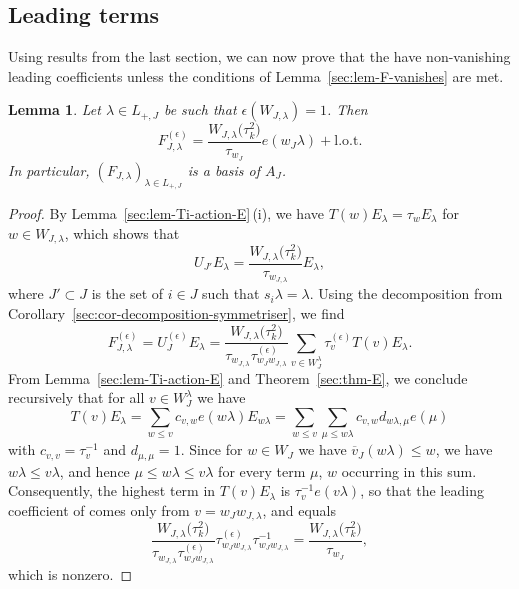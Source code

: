 \documentclass[10pt,a4paper]{amsart}
\newtheorem{Lemma}[Theorem]{Lemma}
\theoremstyle{definition}
\numberwithin{equation}{section}
\begin{document}
\subsection{Leading terms}
Using results from the last section, we can now prove that the
 have non-vanishing leading coefficients unless
the conditions of Lemma~\ref{sec:lem-F-vanishes} are met.

\begin{Lemma}\label{sec:lem-F-leading}
 Let $\lambda\in L_{+,J}$ be such that $\epsilon(W_{J,\lambda})=1$. Then
 \[
 F^{(\epsilon)}_{J,\lambda} = \frac{W_{J,\lambda}\bigl(\tau_k^2\bigr)}{\tau_{w_J}} e(w_J\lambda) + \text{l.o.t.}
 \]
 In particular, $(F_{J,\lambda})_{\lambda\in L_{+,J}}$ is a basis of $A_J$.
\end{Lemma}
\begin{proof}
 By Lemma~\ref{sec:lem-Ti-action-E}\,(i), we have
 $T(w)E_\lambda=\tau_w E_\lambda$ for $w\in W_{J,\lambda}$, which shows that
 \[
 U_{J'} E_\lambda = \frac{W_{J,\lambda}\bigl(\tau_k^2\bigr)}{\tau_{w_{J,\lambda}}}
 E_\lambda,
 \]
 where $J'\subset J$ is the set of $i\in J$ such that $s_i\lambda=\lambda$.
 Using the decomposition from Corollary~\ref{sec:cor-decomposition-symmetriser}, we find
 \[
 F^{(\epsilon)}_{J,\lambda}
 = U^{(\epsilon)}_J E_\lambda
 = \frac{W_{J,\lambda}\bigl(\tau_k^2\bigr)}{\tau_{w_{J,\lambda}} \tau^{(\epsilon)}_{w_Jw_{J,\lambda}}}
 \sum_{v\in W_J^\lambda} \tau^{(\epsilon)}_v T(v) E_\lambda.
 \]
 From Lemma~\ref{sec:lem-Ti-action-E} and Theorem~\ref{sec:thm-E}, we
 conclude recursively that for all $v\in W_J^\lambda$ we have
 \[
 T(v)E_\lambda = \sum_{w\le v} c_{v,w} e(w\lambda)E_{w\lambda}
 = \sum_{w\le v}\sum_{\mu\le w\lambda} c_{v,w} d_{w\lambda,\mu} e(\mu)
 \]
 with $c_{v,v}=\tau_v^{-1}$ and $d_{\mu,\mu}=1$. Since for $w\in W_J$ we have
 $\overline{v}_J(w\lambda)\le w$, we have $w\lambda\le v\lambda$,
 and hence $\mu\le w\lambda\le v\lambda$ for every term $\mu$, $w$ occurring
 in this sum. Consequently, the highest term in $T(v)E_\lambda$ is
 $\tau_v^{-1}e(v\lambda)$, so that the leading coefficient of  comes only from $v=w_Jw_{J,\lambda}$, and equals
 \[
 \frac{W_{J,\lambda}\bigl(\tau_k^2\bigr)}{\tau_{w_{J,\lambda}} \tau^{(\epsilon)}_{w_Jw_{J,\lambda}}}
 \tau^{(\epsilon)}_{w_Jw_{J,\lambda}} \tau_{w_J w_{J,\lambda}}^{-1}
 = \frac{W_{J,\lambda}\bigl(\tau_k^2\bigr)}{\tau_{w_J}},
 \]
 which is nonzero.


\end{proof}
\end{document}
